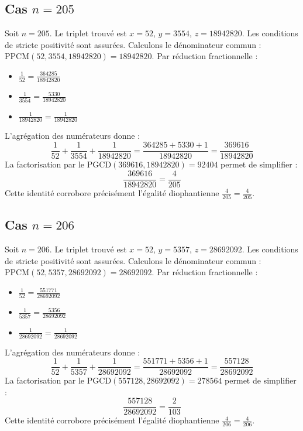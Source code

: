 \documentclass[11pt,a4paper]{article}
\begin{document}
\subsection{Cas $n = 205$}
Soit $n = 205$. Le triplet trouvé est $x = 52$, $y = 3554$, $z = 18942820$.
Les conditions de stricte positivité sont assurées.
Calculons le dénominateur commun : $\text{PPCM}(52, 3554, 18942820) = 18942820$.
Par réduction fractionnelle :
\begin{itemize}
    \item $\frac{1}{52} = \frac{364285}{18942820}$
    \item $\frac{1}{3554} = \frac{5330}{18942820}$
    \item $\frac{1}{18942820} = \frac{1}{18942820}$
\end{itemize}
L'agrégation des numérateurs donne :
$$ \frac{1}{52} + \frac{1}{3554} + \frac{1}{18942820} = \frac{364285 + 5330 + 1}{18942820} = \frac{369616}{18942820} $$
La factorisation par le $\text{PGCD}(369616, 18942820) = 92404$ permet de simplifier :
$$ \frac{369616}{18942820} = \frac{4}{205} $$
Cette identité corrobore précisément l'égalité diophantienne $\frac{4}{205} = \frac{4}{205}$.

\subsection{Cas $n = 206$}
Soit $n = 206$. Le triplet trouvé est $x = 52$, $y = 5357$, $z = 28692092$.
Les conditions de stricte positivité sont assurées.
Calculons le dénominateur commun : $\text{PPCM}(52, 5357, 28692092) = 28692092$.
Par réduction fractionnelle :
\begin{itemize}
    \item $\frac{1}{52} = \frac{551771}{28692092}$
    \item $\frac{1}{5357} = \frac{5356}{28692092}$
    \item $\frac{1}{28692092} = \frac{1}{28692092}$
\end{itemize}
L'agrégation des numérateurs donne :
$$ \frac{1}{52} + \frac{1}{5357} + \frac{1}{28692092} = \frac{551771 + 5356 + 1}{28692092} = \frac{557128}{28692092} $$
La factorisation par le $\text{PGCD}(557128, 28692092) = 278564$ permet de simplifier :
$$ \frac{557128}{28692092} = \frac{2}{103} $$
Cette identité corrobore précisément l'égalité diophantienne $\frac{4}{206} = \frac{4}{206}$.
\end{document}
